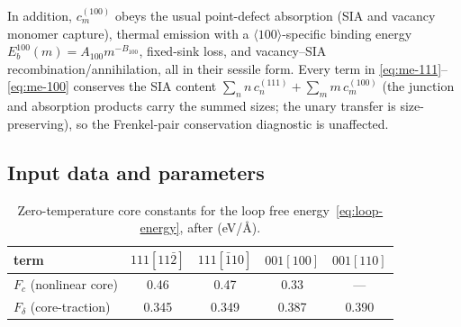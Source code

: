 In addition, $c_m^{(100)}$ obeys the usual point-defect absorption (SIA and
vacancy monomer capture), thermal emission with a $\langle100\rangle$-specific
binding energy $E_b^{100}(m)=A_{100}m^{-B_{100}}$, fixed-sink loss, and
vacancy--SIA recombination/annihilation, all in their sessile form.  Every term
in \eqref{eq:me-111}--\eqref{eq:me-100} conserves the SIA content
$\sum_n n\,c_n^{(111)}+\sum_m m\,c_m^{(100)}$ (the junction and absorption
products carry the summed sizes; the unary transfer is size-preserving), so the
Frenkel-pair conservation diagnostic is unaffected.

\subsection{Input data and parameters}
\label{sec:loop-conversion-data}

\begin{table}[ht]
\centering
\caption{Zero-temperature core constants for the loop free
energy~\eqref{eq:loop-energy}, after \citet{Dudarev2008} (eV/\AA).}
\label{tab:core-constants}
\begin{tabular}{lcccc}
\toprule
term & $111[11\bar2]$ & $111[\bar110]$ & $001[100]$ & $001[110]$ \\
\midrule
$F_c$ (nonlinear core)   & 0.46 & 0.47 & 0.33 & --- \\
$F_\delta$ (core-traction) & 0.345 & 0.349 & 0.387 & 0.390 \\
\bottomrule
\end{tabular}
\end{table}

